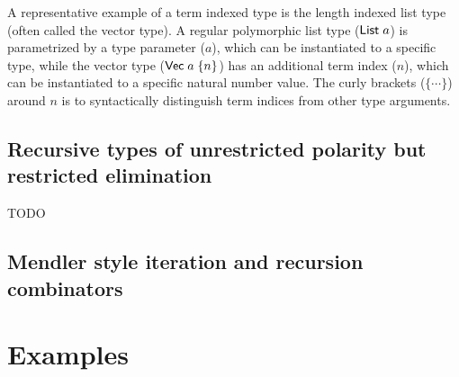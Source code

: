 A representative example of a term
indexed type is the length indexed list type (often called the vector type).
A regular polymorphic list type ($\mathsf{List}\;a$) is parametrized by a type
parameter ($a$), which can be instantiated to a specific type, while the
vector type ($\mathsf{Vec}\;a\;\{n\}$) has an additional term index ($n$), which
can be instantiated to a specific natural number value. The curly brackets
($\{\cdots\}$) around $n$ is to syntactically distinguish term indices from
other type arguments. 

\subsection{Recursive types of unrestricted polarity but restricted elimination}
\label{sec:bg:recty}
TODO

\subsection{Mendler style iteration and recursion combinators}
\label{sec:bg:Mendler}


\section{Examples}\label{sec:examples}

